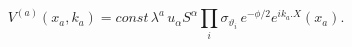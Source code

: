 \begin{equation}
V^{(a)}(x_{a},k_{a})=const\, \lambda ^{a}\, u_{\alpha }S^{\alpha }\prod
_{i}\sigma_{\vartheta_i}\, e^{-\phi /2}e^{ik_{a}.X}(x_{a}).
\end{equation}

